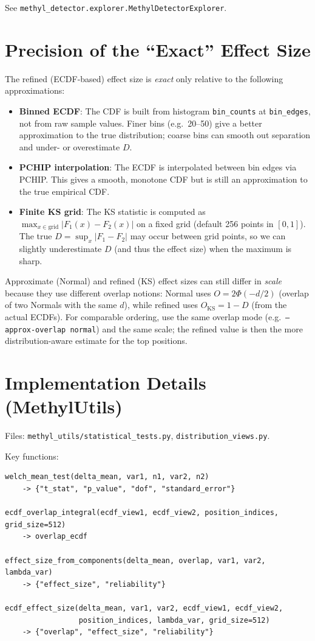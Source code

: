 \documentclass{article}
\begin{document}
See \texttt{methyl\_detector.explorer.MethylDetectorExplorer}.

\section{Precision of the ``Exact'' Effect Size}

The refined (ECDF-based) effect size is \emph{exact} only relative to the following approximations:

\begin{itemize}
    \item \textbf{Binned ECDF}: The CDF is built from histogram \texttt{bin\_counts} at \texttt{bin\_edges}, not from raw sample values. Finer bins (e.g.\ 20--50) give a better approximation to the true distribution; coarse bins can smooth out separation and under- or overestimate $D$.
    \item \textbf{PCHIP interpolation}: The ECDF is interpolated between bin edges via PCHIP. This gives a smooth, monotone CDF but is still an approximation to the true empirical CDF.
    \item \textbf{Finite KS grid}: The KS statistic is computed as $\max_{x \in \text{grid}} |F_1(x) - F_2(x)|$ on a fixed grid (default 256 points in $[0,1]$). The true $D = \sup_x |F_1 - F_2|$ may occur between grid points, so we can slightly underestimate $D$ (and thus the effect size) when the maximum is sharp.
\end{itemize}

Approximate (Normal) and refined (KS) effect sizes can still differ in \emph{scale} because they use different overlap notions: Normal uses $O = 2\Phi(-d/2)$ (overlap of two Normals with the same $d$), while refined uses $O_{\text{KS}} = 1 - D$ (from the actual ECDFs). For comparable ordering, use the same overlap mode (e.g.\ \texttt{--approx-overlap normal}) and the same scale; the refined value is then the more distribution-aware estimate for the top positions.

\section{Implementation Details (MethylUtils)}

Files: \texttt{methyl\_utils/statistical\_tests.py}, \texttt{distribution\_views.py}.

Key functions:

\begin{verbatim}
welch_mean_test(delta_mean, var1, n1, var2, n2)
    -> {"t_stat", "p_value", "dof", "standard_error"}

ecdf_overlap_integral(ecdf_view1, ecdf_view2, position_indices, grid_size=512)
    -> overlap_ecdf

effect_size_from_components(delta_mean, overlap, var1, var2, lambda_var)
    -> {"effect_size", "reliability"}

ecdf_effect_size(delta_mean, var1, var2, ecdf_view1, ecdf_view2,
                 position_indices, lambda_var, grid_size=512)
    -> {"overlap", "effect_size", "reliability"}
\end{verbatim}
\end{document}
